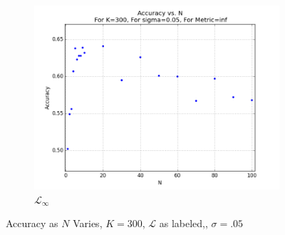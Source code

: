 \documentclass{article}
\begin{document}
\begin{figure}[H]
\centering
   \ContinuedFloat 
    \begin{subfigure}[h]{.75\textwidth}
    	\includegraphics[width=\textwidth]{l-experiment1-2-accuracy-n-k-300-s-005-linf.png}
    	\caption{$\mathcal{L}_{\infty}$}
	\label{fig:exp1-2-accuracy-n-inf}
    \end{subfigure}
    	\caption{Accuracy as $N$ Varies, $K=300$, $\mathcal{L}$ as labeled,, $\sigma=.05$}
    \label{fig:exp1-2-accuracy-n}
\end{figure}
\end{document}
